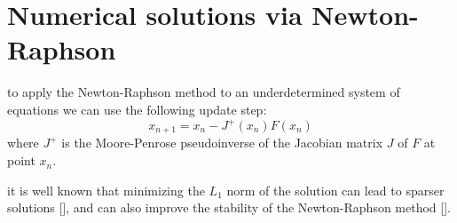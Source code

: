 \section*{Numerical solutions via Newton-Raphson}
to apply the Newton-Raphson method to an underdetermined system of equations we can use the following update step\cite{BenIsrael1966ANM}: \[x_{n+1} = x_n - J^+(x_n) F(x_n)\] where $J^+$ is the Moore-Penrose pseudoinverse of the Jacobian matrix $J$ of $F$ at point $x_n$.

it is well known that minimizing the $L_1$ norm of the solution can lead to sparser solutions [], and can also improve the stability of the Newton-Raphson method []. %
